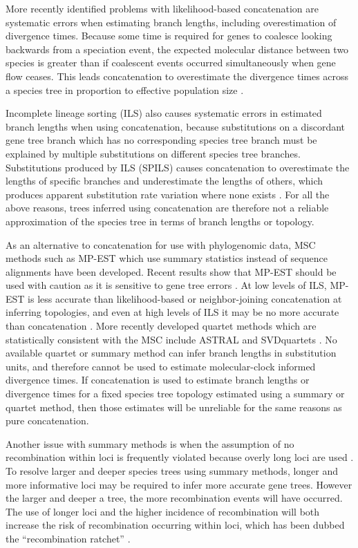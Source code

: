 \documentclass[12pt]{article}
\begin{document}
More recently identified problems with likelihood-based concatenation are
systematic errors when estimating branch lengths, including overestimation of
divergence times. Because some time is required for genes to coalesce
looking backwards from a speciation event, the expected molecular distance
between two species is greater than if coalescent events occurred
simultaneously when
gene flow ceases. This leads concatenation to overestimate the divergence
times across a species tree in proportion to effective population size
\citep{doi:10.1146/annurev.ecolsys.33.010802.150500, Ogilvie01052016}.

Incomplete lineage sorting (ILS) also causes systematic errors in estimated
branch lengths when using concatenation, because substitutions on a discordant
gene tree branch which has no corresponding species tree branch must be
explained by multiple substitutions on different species tree branches.
Substitutions produced by ILS (SPILS) causes concatenation to overestimate the
lengths of specific branches and underestimate the lengths of others, which
produces apparent substitution rate variation where none exists
\citep{Mendes01072016}. For all the above reasons, trees inferred using
concatenation are therefore not a reliable approximation of the species tree
in terms of branch lengths or topology.

As an alternative to concatenation for use with phylogenomic data, MSC methods
such as MP-EST \citep{Liu2010} which use summary statistics instead of
sequence alignments have been developed. Recent results show that MP-EST
should be used with caution as it is sensitive to gene tree errors
\citep{Mirarab15062015, Xi201563}. At low levels of ILS, MP-EST is less
accurate than likelihood-based or neighbor-joining concatenation at inferring
topologies, and even at high levels of ILS it may be no more accurate than
concatenation \citep{Ogilvie01052016}. More recently developed quartet methods
which are statistically consistent with the MSC include ASTRAL and SVDquartets
\citep{Mirarab01092014,doi:10.1093/bioinformatics/btu530}. No available
quartet or summary method can infer branch lengths in substitution units, and
therefore cannot be used to estimate molecular-clock informed divergence
times. If concatenation is used to estimate branch lengths or divergence times
for a fixed species tree topology estimated using a summary or quartet method,
then those estimates will be unreliable for the same reasons as pure
concatenation.

Another issue with summary methods is when the assumption of
no recombination within loci is frequently violated because overly long loci are used \citep{Gatesy26032013}. To
resolve larger and deeper species trees using summary methods, longer and more
informative loci may be required to infer more accurate gene trees. However
the larger and deeper a tree, the more recombination events will have occurred.
The use of longer loci and the higher incidence of recombination will both
increase the risk of recombination occurring within loci, which has been dubbed
the ``recombination ratchet'' \citep{Springer20161}.
\end{document}
